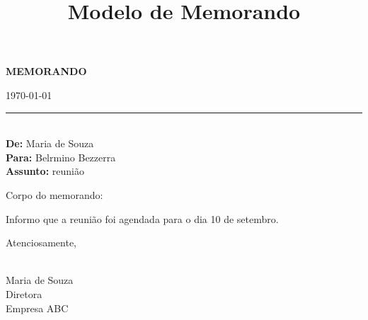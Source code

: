 \documentclass[a4paper,12pt]{article}
\title{Modelo de Memorando}
\author{}
\date{}
\begin{document}
\begin{center}
    \textbf{MEMORANDO}
\end{center}

\bigskip

\begin{flushright}
    \today \\
    \rule{5cm}{0.4pt} \\
    \textbf{De:} Maria de Souza \\
    \textbf{Para:} Belrmino Bezzerra \\
    \textbf{Assunto:} reunião
\end{flushright}

\bigskip

Corpo do memorando:

\bigskip

Informo que a reunião foi agendada para o dia 10 de setembro.

\bigskip

Atenciosamente,

\bigskip

\hrulefill \\
Maria de Souza \\
Diretora \\
Empresa ABC
\end{document}
